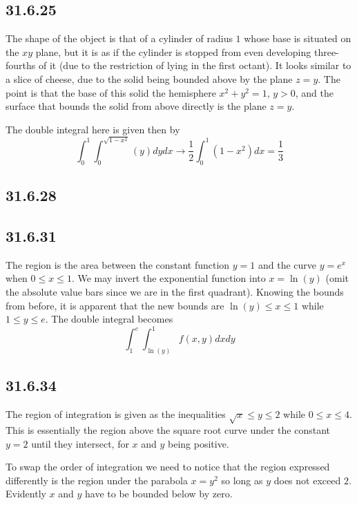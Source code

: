 \documentclass{article}
\begin{document}
\subsection{31.6.25}

The shape of the object is that of a cylinder of radius $1$ whose base is situated on the $xy$ plane, but it is as if the cylinder is stopped from even developing three-fourths of it (due to the restriction of lying in the first octant). It looks similar to a slice of cheese, due to the solid being bounded above by the plane $z=y$. The point is that the base of this solid the hemisphere $x^2+y^2=1$, $y>0$, and the surface that bounds the solid from above directly is the plane $z=y$.

The double integral here is given then by $$\int_{0}^1\int_0^{\sqrt{1-x^2}}(y)dydx \to \frac{1}{2}\int_{0}^1 (1-x^2)dx = \frac{1}{3}$$

\subsection{31.6.28}

\subsection{31.6.31}

The region is the area between the constant function $y = 1$ and the curve $y = e^x$ when $0\leq x \leq 1$. We may invert the exponential function into $x = \ln(y)$ (omit the absolute value bars since we are in the first quadrant). Knowing the bounds from before, it is apparent that the new bounds are $\ln(y) \leq x \leq 1$ while $1 \leq y \leq e$. The double integral becomes $$\int_1^e\int_{\ln(y)}^{1}f(x,y)dxdy$$

\subsection{31.6.34}

The region of integration is given as the inequalities $\sqrt{x} \leq y \leq 2$ while $0 \leq x \leq 4$. This is essentially the region above the square root curve under the constant $y=2$ until they intersect, for $x$ and $y$ being positive.

To swap the order of integration we need to notice that the region expressed differently is the region under the parabola $x=y^2$ so long as $y$ does not exceed $2$. Evidently $x$ and $y$ have to be bounded below by zero.
\end{document}
